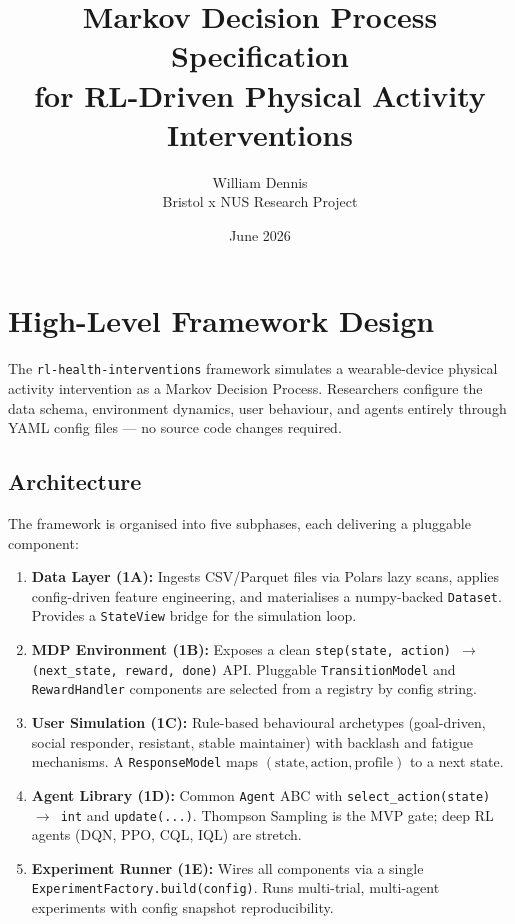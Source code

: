 \documentclass[11pt,a4paper]{article}
\title{Markov Decision Process Specification\\for RL-Driven Physical Activity Interventions}
\author{William Dennis\\Bristol x NUS Research Project}
\date{June 2026}
\begin{document}
\maketitle

\section{High-Level Framework Design}

The \texttt{rl-health-interventions} framework simulates a wearable-device
physical activity intervention as a Markov Decision Process. Researchers
configure the data schema, environment dynamics, user behaviour, and agents
entirely through YAML config files --- no source code changes required.

\subsection{Architecture}

The framework is organised into five subphases, each delivering a pluggable
component:

\begin{enumerate}
    \item \textbf{Data Layer (1A):} Ingests CSV/Parquet files via Polars lazy
    scans, applies config-driven feature engineering, and materialises a
    numpy-backed \texttt{Dataset}. Provides a \texttt{StateView} bridge for
    the simulation loop.
    \item \textbf{MDP Environment (1B):} Exposes a clean
    \texttt{step(state, action) $\rightarrow$ (next\_state, reward, done)} API.
    Pluggable \texttt{TransitionModel} and \texttt{RewardHandler} components
    are selected from a registry by config string.
    \item \textbf{User Simulation (1C):} Rule-based behavioural archetypes
    (goal-driven, social responder, resistant, stable maintainer) with
    backlash and fatigue mechanisms. A \texttt{ResponseModel} maps
    $(\text{state}, \text{action}, \text{profile})$ to a next state.
    \item \textbf{Agent Library (1D):} Common \texttt{Agent} ABC with
    \texttt{select\_action(state) $\rightarrow$ int} and
    \texttt{update(...)}. Thompson Sampling is the MVP gate; deep RL
    agents (DQN, PPO, CQL, IQL) are stretch.
    \item \textbf{Experiment Runner (1E):} Wires all components via a single
    \texttt{ExperimentFactory.build(config)}. Runs multi-trial, multi-agent
    experiments with config snapshot reproducibility.
\end{enumerate}
\end{document}
